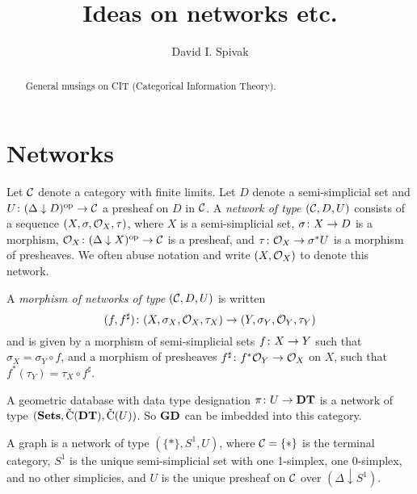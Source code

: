\documentclass{amsart}
\def\DT{{\bf DT}}
\def\GD{{\bf GD}}
\begin{document}
\author{David I. Spivak}

\title{Ideas on networks etc.}

\maketitle

\tableofcontents

\begin{abstract}

General musings on CIT (Categorical Information Theory).

\end{abstract}

\section{Networks}

\begin{definition}

Let $\mathcal{C}$ denote a category with finite limits.  Let $D$ denote a semi-simplicial set and $U\colon(\Delta\downarrow D)^\textnormal{op}\rightarrow\mathcal{C}$ a presheaf on $D$ in $\mathcal{C}$.  A {\em network of type $(\mathcal{C},D,U)$} consists of a sequence $(X,\sigma,\mathcal{O}_X,\tau)$, where $X$ is a semi-simplicial set, $\sigma\colon X\rightarrow D$ is a morphism, $\mathcal{O}_X\colon (\Delta\downarrow X)^\textnormal{op}\rightarrow\mathcal{C}$ is a presheaf, and $\tau\colon\mathcal{O}_X\rightarrow\sigma^*U$ is a morphism of presheaves.  We often abuse notation and write $(X,\mathcal{O}_X)$ to denote this network.

A {\em morphism of networks of type $(\mathcal{C},D,U)$} is written $$(f,f^\sharp)\colon (X,\sigma_X,\mathcal{O}_X,\tau_X)\rightarrow(Y,\sigma_Y,\mathcal{O}_Y,\tau_Y)$$ and is given by a morphism of semi-simplicial sets $f\colon X\rightarrow Y$ such that $\sigma_X=\sigma_Y\circ f$, and a morphism of presheaves $f^\sharp\colon f^*\mathcal{O}_Y\rightarrow\mathcal{O}_X$ on $X$, such that $f^*(\tau_Y)=\tau_X\circ f^\sharp$.

\end{definition}

\begin{example}

A geometric database with data type designation $\pi\taking U\to\DT$ is a network of type $(\Sets,\C(\DT),\C(U))$.  So $\GD$ can be imbedded into this category.

\end{example}

\begin{example}

A graph is a network of type $(\{*\},S^1,U)$, where $\mathcal{C}=\{*\}$ is the terminal category, $S^1$ is the unique semi-simplicial set with one 1-simplex, one 0-simplex, and no other simplicies, and $U$ is the unique presheaf on $\mathcal{C}$ over $(\Delta\downarrow S^1)$.  

\end{example}
\end{document}
